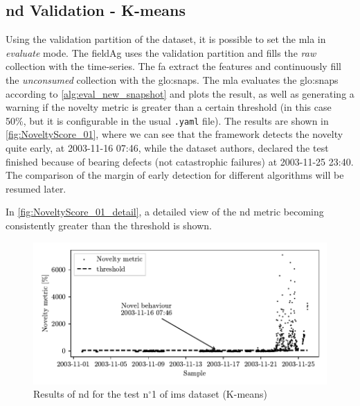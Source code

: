 \subsection{\gls{nd} Validation - K-means}
Using the validation partition of the dataset, it is possible to set the \gls{mla} in \emph{evaluate} mode. The \gls{fieldAg} uses the validation partition and fills the \emph{raw} collection with the time-series. The {\gls{fa}} extract the features and continuously fill the \emph{unconsumed} collection with the \gls{glo:snap}s. The \gls{mla} evaluates the \gls{glo:snap}s according to \autoref{alg:eval_new_snapshot}  and plots the result, as well as generating a warning if the novelty metric is greater than a certain threshold (in this case 50\%, but it is configurable in the usual \texttt{.yaml} file). The results are shown in \autoref{fig:NoveltyScore_01}, where we can see that the framework detects the novelty quite early, at 2003-11-16 07:46, while the dataset authors, declared the test finished because of bearing defects (not catastrophic failures) at 2003-11-25 23:40. The comparison of the margin of early detection for different algorithms will be resumed later.

In \autoref{fig:NoveltyScore_01_detail}, a detailed view of the \gls{nd} metric becoming consistently greater than the threshold is shown.

\begin{figure}
    \centering
    \includegraphics{images/IMS/Novelty_01_500samples_bearing3x.pdf}
    \caption{Results of \gls{nd} for the test $\text{n}^\circ$1 of \gls{ims} dataset (K-means)}
    \label{fig:NoveltyScore_01} 
\end{figure}


